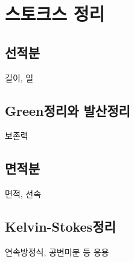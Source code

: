 \documentclass{../../large}
\begin{document}
\section{}
\section{}
\section{}
\section{}






\chapter{스토크스 정리}
\section{선적분}
길이, 일
\section{Green정리와 발산정리}
보존력
\section{면적분}
면적, 선속
\section{Kelvin-Stokes정리}

연속방정식, 공변미분 등 응용
\end{document}
